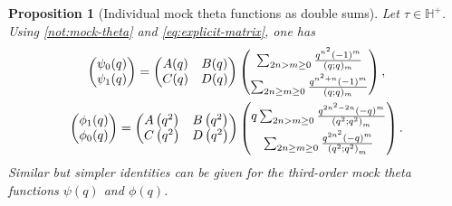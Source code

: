 \documentclass[reqno,11pt]{amsart}
\newtheorem{proposition}[theorem]{Proposition}
\theoremstyle{definition}
\theoremstyle{remark}
\numberwithin{equation}{section}
\renewcommand{\H}{{\mathbb{H}}}
\begin{document}
\begin{proposition}[Individual mock theta functions as double sums] \label{prop:mock-theta-individual}
Let $\tau \in \H^+$. Using \cref{not:mock-theta} and \cref{eq:explicit-matrix}, one has
\begin{gather*}
    \begin{pmatrix}
    \psi_0(q) \\
    \psi_1(q) 
    \end{pmatrix}
    =
    \begin{pmatrix}
    A(q) & B(q) \\
    C(q) & D(q)
    \end{pmatrix}
    \begin{pmatrix}
    \sum_{2n > m \ge 0} \frac{q^{n^2}(-1)^m}{(q; q)_m} \vspace{0.1cm}\\
    \sum_{2n \ge m \ge 0} \frac{q^{n^2+n}(-1)^m}{(q; q)_m}
    \end{pmatrix},
    \\
    \begin{pmatrix}
    \phi_1(q) \\
    \phi_0(q) 
    \end{pmatrix}
    =
    \begin{pmatrix}
    A\left(q^2\right) & B\left(q^2\right) \\
    C\left(q^2\right) & D\left(q^2\right)
    \end{pmatrix}
    \begin{pmatrix}
    q\sum_{2n > m \ge 0} \frac{q^{2n^2-2n} (-q)^m}{\left(q^2; q^2\right)_m} 
    \vspace{0.1cm}\\
    \sum_{2n \ge m \ge 0} \frac{q^{2n^2} (-q)^m}{\left(q^2; q^2\right)_m} 
    \end{pmatrix}.
\end{gather*}
Similar but simpler identities can be given for the third-order mock theta functions $\psi(q)$ and $\phi(q)$.

\end{proposition}
\end{document}
